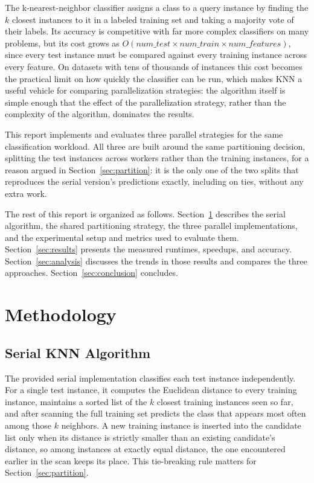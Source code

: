 \documentclass[conference]{IEEEtran}
\begin{document}
The k-nearest-neighbor classifier assigns a class to a query instance by
finding the $k$ closest instances to it in a labeled training set and
taking a majority vote of their labels. Its accuracy is competitive with
far more complex classifiers on many problems, but its cost grows as
$O(\mathit{num\_test} \times \mathit{num\_train} \times
\mathit{num\_features})$, since every test instance must be compared
against every training instance across every feature. On datasets with
tens of thousands of instances this cost becomes the practical limit on
how quickly the classifier can be run, which makes KNN a useful vehicle for
comparing parallelization strategies: the algorithm itself is simple
enough that the effect of the parallelization strategy, rather than the
complexity of the algorithm, dominates the results.

This report implements and evaluates three parallel strategies for the
same classification workload. All three are built around the same
partitioning decision, splitting the test instances across workers rather
than the training instances, for a reason argued in Section~\ref{sec:partition}:
it is the only one of the two splits that reproduces the serial version's
predictions exactly, including on ties, without any extra work.

The rest of this report is organized as follows. Section~\ref{sec:methodology}
describes the serial algorithm, the shared partitioning strategy, the three
parallel implementations, and the experimental setup and metrics used to
evaluate them. Section~\ref{sec:results} presents the measured runtimes,
speedups, and accuracy. Section~\ref{sec:analysis} discusses the trends in
those results and compares the three approaches. Section~\ref{sec:conclusion}
concludes.

\section{Methodology}
\label{sec:methodology}

\subsection{Serial KNN Algorithm}

The provided serial implementation classifies each test instance
independently. For a single test instance, it computes the Euclidean
distance to every training instance, maintains a sorted list of the $k$
closest training instances seen so far, and after scanning the full
training set predicts the class that appears most often among those $k$
neighbors. A new training instance is inserted into the candidate list only
when its distance is strictly smaller than an existing candidate's
distance, so among instances at exactly equal distance, the one encountered
earlier in the scan keeps its place. This tie-breaking rule matters for
Section~\ref{sec:partition}.
\end{document}
